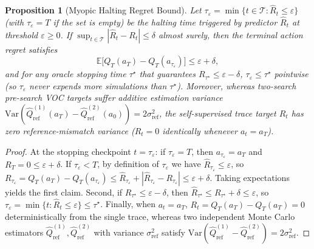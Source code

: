 \documentclass[preprint,3p,times]{elsarticle}
\newtheorem{proposition}{Proposition}
\begin{document}
\begin{proposition}[Myopic Halting Regret Bound]
\label{prop:regret}
Let $\tau_\varepsilon = \min\{t \in \mathcal{T} : \hat{R}_t \le \varepsilon\}$ (with $\tau_\varepsilon = T$ if the set is empty) be the halting time triggered by predictor $\hat{R}_t$ at threshold $\varepsilon \ge 0$. If $\sup_{t \in \mathcal{T}} |\hat{R}_t - R_t| \le \delta$ almost surely, then the terminal action regret satisfies
\begin{equation}
    \mathbb{E}\big[Q_T(a_T) - Q_T(a_{\tau_\varepsilon})\big] \le \varepsilon + \delta,
\end{equation}
and for any oracle stopping time $\tau^\star$ that guarantees $R_{\tau^\star} \le \varepsilon - \delta$, $\tau_\varepsilon \le \tau^\star$ pointwise (so $\tau_\varepsilon$ never expends more simulations than $\tau^\star$). Moreover, whereas two-search pre-search VOC targets suffer additive estimation variance $\mathrm{Var}(\hat{Q}_{\text{ref}}^{(1)}(a_T) - \hat{Q}_{\text{ref}}^{(2)}(a_0)) = 2\sigma_{\text{ref}}^2$, the self-supervised trace target $R_t$ has zero reference-mismatch variance ($R_t = 0$ identically whenever $a_t = a_T$).
\end{proposition}
\begin{proof}
At the stopping checkpoint $t = \tau_\varepsilon$: if $\tau_\varepsilon = T$, then $a_{\tau_\varepsilon} = a_T$ and $R_T = 0 \le \varepsilon + \delta$. If $\tau_\varepsilon < T$, by definition of $\tau_\varepsilon$ we have $\hat{R}_{\tau_\varepsilon} \le \varepsilon$, so $R_{\tau_\varepsilon} = Q_T(a_T) - Q_T(a_{\tau_\varepsilon}) \le \hat{R}_{\tau_\varepsilon} + |\hat{R}_{\tau_\varepsilon} - R_{\tau_\varepsilon}| \le \varepsilon + \delta$. Taking expectations yields the first claim. Second, if $R_{\tau^\star} \le \varepsilon - \delta$, then $\hat{R}_{\tau^\star} \le R_{\tau^\star} + \delta \le \varepsilon$, so $\tau_\varepsilon = \min\{t : \hat{R}_t \le \varepsilon\} \le \tau^\star$. Finally, when $a_t = a_T$, $R_t = Q_T(a_T) - Q_T(a_T) = 0$ deterministically from the single trace, whereas two independent Monte Carlo estimators $\hat{Q}_{\text{ref}}^{(1)}, \hat{Q}_{\text{ref}}^{(2)}$ with variance $\sigma_{\text{ref}}^2$ satisfy $\mathrm{Var}(\hat{Q}_{\text{ref}}^{(1)} - \hat{Q}_{\text{ref}}^{(2)}) = 2\sigma_{\text{ref}}^2$.
\end{proof}
\end{document}
